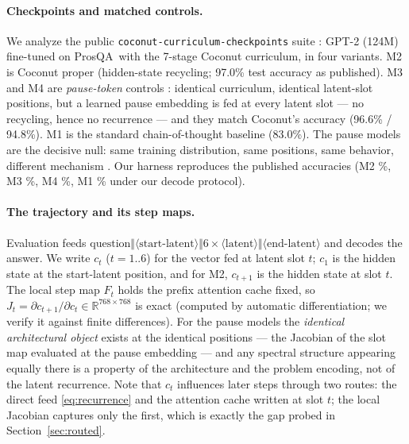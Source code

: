 \documentclass[11pt]{article}
\newcommand{\cthought}[1]{c_{#1}}
\newcommand{\Jt}{J_t}
\newcommand{\prosqa}{ProsQA}
\begin{document}
\paragraph{Checkpoints and matched controls.} We analyze the public
\texttt{coconut-curriculum-checkpoints} suite \citep{martin2026curriculum}: GPT-2
(124M) \citep{radford2019gpt2} fine-tuned on \prosqa\ with the 7-stage Coconut
curriculum, in four variants. M2 is Coconut proper (hidden-state recycling; 97.0\%
test accuracy as published). M3 and M4 are \emph{pause-token} controls
\citep{goyal2024pause}: identical curriculum, identical latent-slot positions, but a
learned pause embedding is fed at every latent slot --- no recycling, hence no
recurrence --- and they match Coconut's accuracy (96.6\% / 94.8\%). M1 is the standard
chain-of-thought baseline (83.0\%). The pause models are the decisive null: same
training distribution, same positions, same behavior, different mechanism
\citep{martin2026curriculum,aswal2026observable}. Our harness reproduces the published
accuracies (M2 \accMTwoPct\%, M3 \accMThreePct\%, M4 \accMFourPct\%, M1 \accMOnePct\%
under our decode protocol).

\paragraph{The trajectory and its step maps.} Evaluation feeds
$\text{question} \Vert \langle\text{start-latent}\rangle \Vert 6\times
\langle\text{latent}\rangle \Vert \langle\text{end-latent}\rangle$ and decodes the
answer. We write $\cthought{t}$ ($t=1..6$) for the vector fed at latent slot $t$;
$\cthought{1}$ is the hidden state at the start-latent position, and for M2,
$\cthought{t+1}$ is the hidden state at slot $t$. The local step map $F_t$ holds the
prefix attention cache fixed, so
$\Jt=\partial\cthought{t+1}/\partial\cthought{t}\in\mathbb{R}^{768\times768}$ is exact
(computed by automatic differentiation; we verify it against finite differences). For
the pause models the \emph{identical architectural object} exists at the identical
positions --- the Jacobian of the slot map evaluated at the pause embedding --- and any
spectral structure appearing equally there is a property of the architecture and the
problem encoding, not of the latent recurrence. Note that $\cthought{t}$ influences
later steps through two routes: the direct feed \eqref{eq:recurrence} and the attention
cache written at slot $t$; the local Jacobian captures only the first, which is exactly
the gap probed in Section~\ref{sec:routed}.
\end{document}
